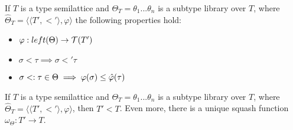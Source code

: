 \documentclass[main.tex]{subfiles}
\begin{document}
\begin{prop}
    If $T$ is a type semilattice and
    $\Theta_T = \theta_1 ... \theta_n$ is a subtype library over $T$, where
    $\hat{\Theta}_T = \langle \langle T', \less' \rangle, \varphi \rangle$
    the following properties hold:
    \begin{itemize}
        \item $\varphi : left(\Theta) \rightarrow \mathcal{T}( T' )$
        \item $\sigma \less \tau \implies \sigma \less' \tau$
        \item $\sigma <: \tau \in \Theta \implies \varphi(\sigma) \leq \hat{\varphi}(\tau)$
    \end{itemize}
\end{prop}

\begin{prop}
    If $T$ is a type semilattice and
    $\Theta_T = \theta_1 ... \theta_n$ is a subtype library over $T$, where
    $\hat{\Theta}_T = \langle \langle T', \less' \rangle, \varphi \rangle$,
    then $T' \less T$. Even more, there is a unique squash function
    $\omega_{\Theta} : T' \rightarrow T$.
\end{prop}
\end{document}
